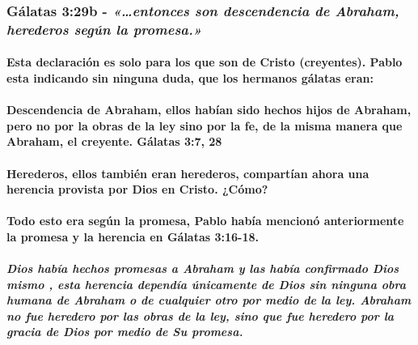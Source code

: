 \documentclass[11a pt,twoside]{article}
\newcommand{\scripture}[1]{%
  {\fontsize{12pt}{16pt}\selectfont\ScriptureFont\itshape #1}%
}
\let\oldsubsubsection\subsubsection
\renewcommand{\subsubsection}{\needspace{4\baselineskip}\oldsubsubsection}
\let\oldparagraph\paragraph
\renewcommand{\paragraph}{\needspace{3\baselineskip}\oldparagraph}
\let\oldsubparagraph\subparagraph
\renewcommand{\subparagraph}{\needspace{2\baselineskip}\oldsubparagraph}
\begin{document}
\subsubsection{\texorpdfstring{Gálatas 3:29b -
\scripture{«…entonces son descendencia de Abraham, herederos según la promesa.»}}{Gálatas 3:29b - }}\label{guxe1latas-329b---entonces-son-descendencia-de-abraham-herederos-seguxfan-la-promesa.}

\paragraph{Esta declaración es solo para los que son de Cristo
(creyentes). Pablo esta indicando sin ninguna duda, que los hermanos
gálatas
eran:}\label{esta-declaraciuxf3n-es-solo-para-los-que-son-de-cristo-creyentes.-pablo-esta-indicando-sin-ninguna-duda-que-los-hermanos-guxe1latas-eran}

\paragraph{Descendencia de Abraham, ellos habían sido hechos hijos de
Abraham, pero no por la obras de la ley sino por la fe, de la misma
manera que Abraham, el creyente. Gálatas 3:7,
28}\label{descendencia-de-abraham-ellos-habuxedan-sido-hechos-hijos-de-abraham-pero-no-por-la-obras-de-la-ley-sino-por-la-fe-de-la-misma-manera-que-abraham-el-creyente.-guxe1latas-37-28}

\paragraph{Herederos, ellos también eran herederos, compartían ahora una
herencia provista por Dios en Cristo.
¿Cómo?}\label{herederos-ellos-tambiuxe9n-eran-herederos-compartuxedan-ahora-una-herencia-provista-por-dios-en-cristo.-cuxf3mo}

\paragraph{Todo esto era según la promesa, Pablo había mencionó
anteriormente la promesa y la herencia en Gálatas
3:16-18.}\label{todo-esto-era-seguxfan-la-promesa-pablo-habuxeda-mencionuxf3-anteriormente-la-promesa-y-la-herencia-en-guxe1latas-316-18.}

\subparagraph{Dios había hechos promesas a Abraham y las había
confirmado Dios mismo , esta herencia dependía únicamente de Dios sin
ninguna obra humana de Abraham o de cualquier otro por medio de la ley.
Abraham no fue heredero por las obras de la ley, sino que fue heredero
por la gracia de Dios por medio de Su
promesa.}\label{dios-habuxeda-hechos-promesas-a-abraham-y-las-habuxeda-confirmado-dios-mismo-esta-herencia-dependuxeda-uxfanicamente-de-dios-sin-ninguna-obra-humana-de-abraham-o-de-cualquier-otro-por-medio-de-la-ley.-abraham-no-fue-heredero-por-las-obras-de-la-ley-sino-que-fue-heredero-por-la-gracia-de-dios-por-medio-de-su-promesa.}
\end{document}
